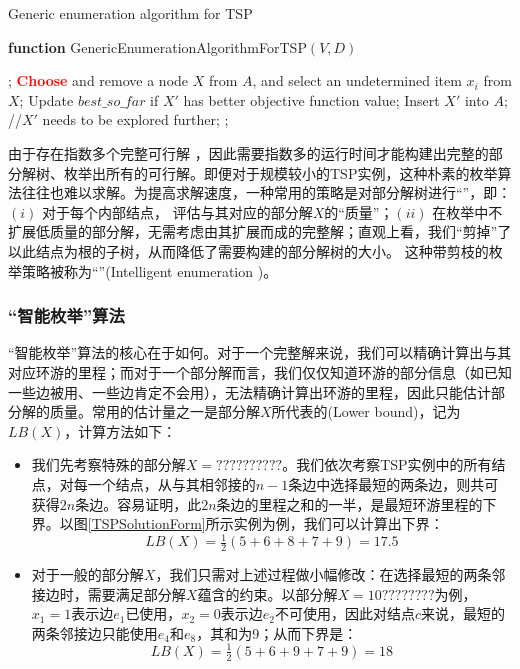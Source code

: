 \begin{algorithm}[H]
\caption{Generic enumeration algorithm for TSP}\label{TSPEmumerationAlgo}   
{\bf function} {\sc GenericEnumerationAlgorithmForTSP$(V, D)$}	
\begin{algorithmic}[1]
;
	\STATE \textcolor{red}{\bf Choose} and remove a node $X$ from $A$, 
	and select an undetermined item $x_{i}$ from $X$;
			\STATE Update $best\_so\_far$ if $X'$ has better objective function value;
		\ELSE
			\STATE Insert $X'$ into $A$; //$X'$ needs to be explored further; 
		\ENDIF
	\ENDFOR
\ENDWHILE
{};
\end{algorithmic}
\end{algorithm}

   由于存在指数多个完整可行解 ，因此需要指数多的运行时间才能构建出完整的部分解树、枚举出所有的可行解。即便对于规模较小的TSP实例，这种朴素的枚举算法往往也难以求解。为提高求解速度，一种常用的策略是对部分解树进行“”，即：$(i)$ 对于每个内部结点， 评估与其对应的部分解$X$的“质量”；$(ii)$ 在枚举中不扩展低质量的部分解，无需考虑由其扩展而成的完整解；直观上看，我们“剪掉”了以此结点为根的子树，从而降低了需要构建的部分解树的大小。  
    这种带剪枝的枚举策略被称为“”(Intelligent enumeration \cite{PapadimitriouBook})。
   
\subsubsection*{“智能枚举”算法}    
	“智能枚举”算法的核心在于如何。对于一个完整解来说，我们可以精确计算出与其对应环游的里程；而对于一个部分解而言，我们仅仅知道环游的部分信息（如已知一些边被用、一些边肯定不会用），无法精确计算出环游的里程，因此只能估计部分解的质量。常用的估计量之一是部分解$X$所代表的(Lower bound)，记为$LB(X)$，计算方法如下：
	
	\begin{itemize}
		\item 我们先考察特殊的部分解$X=??????????$。我们依次考察TSP实例中的所有结点，对每一个结点，从与其相邻接的$n-1$条边中选择最短的两条边，则共可获得$2n$条边。容易证明，此$2n$条边的里程之和的一半，是最短环游里程的下界。以图\ref{TSPSolutionForm}所示实例为例，我们可以计算出下界：
\[
	LB(X) = \tfrac{1}{2}(5+6+8+7+9)=17.5
\]		
		\item 对于一般的部分解$X$，我们只需对上述过程做小幅修改：在选择最短的两条邻接边时，需要满足部分解$X$蕴含的约束。以部分解$X=10????????$为例，$x_1 = 1$表示边$e_1$已使用，$x_2=0$表示边$e_2$不可使用，因此对结点$c$来说，最短的两条邻接边只能使用$e_4$和$e_8$，其和为9；从而下界是：
\[
	LB(X) = 	\tfrac{1}{2}(5+6+9+7+9)=18			
\]
	\end{itemize}

